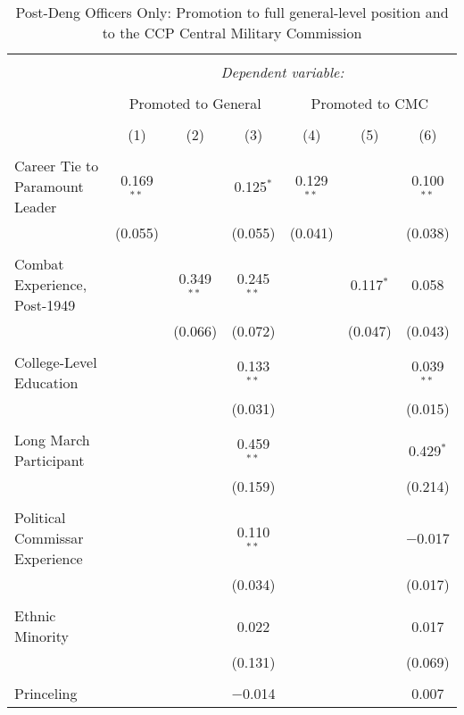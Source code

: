 
\begin{table}[!htbp] \centering 
  \caption{Post-Deng Officers Only: Promotion to full general-level position and to the CCP Central Military Commission} 
  \label{table_a11} 
\begin{tabular}{@{\extracolsep{5pt}}lcccccc} 
\\[-1.8ex]\hline 
\hline \\[-1.8ex] 
 & \multicolumn{6}{c}{\textit{Dependent variable:}} \\ 
\cline{2-7} 
\\[-1.8ex] & \multicolumn{3}{c}{Promoted to General} & \multicolumn{3}{c}{Promoted to CMC} \\ 
\\[-1.8ex] & (1) & (2) & (3) & (4) & (5) & (6)\\ 
\hline \\[-1.8ex] 
 Career Tie to Paramount Leader & 0.169$^{**}$ &  & 0.125$^{*}$ & 0.129$^{**}$ &  & 0.100$^{**}$ \\ 
  & (0.055) &  & (0.055) & (0.041) &  & (0.038) \\ 
  & & & & & & \\ 
 Combat Experience, Post-1949 &  & 0.349$^{**}$ & 0.245$^{**}$ &  & 0.117$^{*}$ & 0.058 \\ 
  &  & (0.066) & (0.072) &  & (0.047) & (0.043) \\ 
  & & & & & & \\ 
 College-Level Education &  &  & 0.133$^{**}$ &  &  & 0.039$^{**}$ \\ 
  &  &  & (0.031) &  &  & (0.015) \\ 
  & & & & & & \\ 
 Long March Participant &  &  & 0.459$^{**}$ &  &  & 0.429$^{*}$ \\ 
  &  &  & (0.159) &  &  & (0.214) \\ 
  & & & & & & \\ 
 Political Commissar Experience &  &  & 0.110$^{**}$ &  &  & $-$0.017 \\ 
  &  &  & (0.034) &  &  & (0.017) \\ 
  & & & & & & \\ 
 Ethnic Minority &  &  & 0.022 &  &  & 0.017 \\ 
  &  &  & (0.131) &  &  & (0.069) \\ 
  & & & & & & \\ 
 Princeling &  &  & $-$0.014 &  &  & 0.007 \\ 

\end{tabular}
\end{table}
